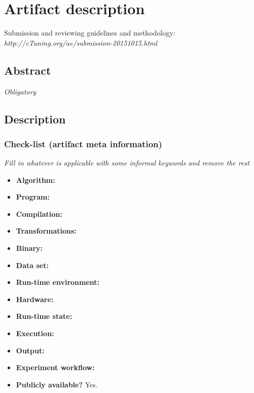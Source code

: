 \documentclass{sigplanconf}
\begin{document}


\appendix
\section{Artifact description}

Submission and reviewing guidelines and methodology: \\
{\em http://cTuning.org/ae/submission-20151015.html}

\subsection{Abstract}

{\em Obligatory}

\subsection{Description}

\subsubsection{Check-list (artifact meta information)}

{\em Fill in whatever is applicable with some informal keywords and remove the rest}

{\small
\begin{itemize}
  \item {\bf Algorithm: }
  \item {\bf Program: }
  \item {\bf Compilation: }
  \item {\bf Transformations: }
  \item {\bf Binary: }
  \item {\bf Data set: }
  \item {\bf Run-time environment: }
  \item {\bf Hardware: }
  \item {\bf Run-time state: }
  \item {\bf Execution: }
  \item {\bf Output: }
  \item {\bf Experiment workflow: }
  \item {\bf Publicly available?} Yes.
\end{itemize}
}
\end{document}
